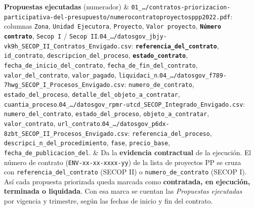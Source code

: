 \documentclass[11pt,a4paper]{article}
\begin{document}
{\begin{longtable}
\textbf{Propuestas ejecutadas} (numerador) & \texttt{01\_\allowbreak{}\ldots{}/\allowbreak{}contratos-\allowbreak{}priorizacion-\allowbreak{}participativa-\allowbreak{}del-\allowbreak{}presupuesto/\allowbreak{}numerocontratoproyectosppp2022.\allowbreak{}pdf}: columnas \texttt{Zona}, \texttt{Unidad Ejecutora}, \texttt{Proyecto}, \texttt{Valor proyecto}, \textbf{\texttt{Número contrato}}, \texttt{Secop I} / \texttt{Secop II}.\newline \texttt{04\_\allowbreak{}\ldots{}/\allowbreak{}datosgov\_\allowbreak{}jbjy-\allowbreak{}vk9h\_\allowbreak{}SECOP\_\allowbreak{}II\_\allowbreak{}Contratos\_\allowbreak{}Envigado.\allowbreak{}csv}: \textbf{\texttt{referencia\_\allowbreak{}del\_\allowbreak{}contrato}}, \texttt{id\_\allowbreak{}contrato}, \texttt{descripcion\_\allowbreak{}del\_\allowbreak{}proceso}, \textbf{\texttt{estado\_\allowbreak{}contrato}}, \texttt{fecha\_\allowbreak{}de\_\allowbreak{}inicio\_\allowbreak{}del\_\allowbreak{}contrato}, \texttt{fecha\_\allowbreak{}de\_\allowbreak{}fin\_\allowbreak{}del\_\allowbreak{}contrato}, \texttt{valor\_\allowbreak{}del\_\allowbreak{}contrato}, \texttt{valor\_\allowbreak{}pagado}, \texttt{liquidaci\_\allowbreak{}n}.\newline \texttt{04\_\allowbreak{}\ldots{}/\allowbreak{}datosgov\_\allowbreak{}f789-\allowbreak{}7hwg\_\allowbreak{}SECOP\_\allowbreak{}I\_\allowbreak{}Procesos\_\allowbreak{}Envigado.\allowbreak{}csv}: \texttt{numero\_\allowbreak{}de\_\allowbreak{}contrato}, \texttt{estado\_\allowbreak{}del\_\allowbreak{}proceso}, \texttt{detalle\_\allowbreak{}del\_\allowbreak{}objeto\_\allowbreak{}a\_\allowbreak{}contratar}, \texttt{cuantia\_\allowbreak{}proceso}.\newline \texttt{04\_\allowbreak{}\ldots{}/\allowbreak{}datosgov\_\allowbreak{}rpmr-\allowbreak{}utcd\_\allowbreak{}SECOP\_\allowbreak{}Integrado\_\allowbreak{}Envigado.\allowbreak{}csv}: \texttt{numero\_\allowbreak{}del\_\allowbreak{}contrato}, \texttt{estado\_\allowbreak{}del\_\allowbreak{}proceso}, \texttt{objeto\_\allowbreak{}a\_\allowbreak{}contratar}, \texttt{valor\_\allowbreak{}contrato}, \texttt{url\_\allowbreak{}contrato}.\newline \texttt{04\_\allowbreak{}\ldots{}/\allowbreak{}datosgov\_\allowbreak{}p6dx-\allowbreak{}8zbt\_\allowbreak{}SECOP\_\allowbreak{}II\_\allowbreak{}Procesos\_\allowbreak{}Envigado.\allowbreak{}csv}: \texttt{referencia\_\allowbreak{}del\_\allowbreak{}proceso}, \texttt{descripci\_\allowbreak{}n\_\allowbreak{}del\_\allowbreak{}procedimiento}, \texttt{fase}, \texttt{precio\_\allowbreak{}base}, \texttt{fecha\_\allowbreak{}de\_\allowbreak{}publicacion\_\allowbreak{}del}. & Da la \textbf{evidencia contractual} de la ejecución. El número de contrato (\texttt{ENV-\allowbreak{}xx-\allowbreak{}xx-\allowbreak{}xxxx-\allowbreak{}yy}) de la lista de proyectos PP se cruza con \texttt{referencia\_\allowbreak{}del\_\allowbreak{}contrato} (SECOP II) o \texttt{numero\_\allowbreak{}de\_\allowbreak{}contrato} (SECOP I). Así cada propuesta priorizada queda marcada como \textbf{contratada, en ejecución, terminada o liquidada}. Con esa marca se cuentan las \emph{Propuestas ejecutadas} por vigencia y trimestre, según las fechas de inicio y fin del contrato. \\

\end{longtable}}
\end{document}
